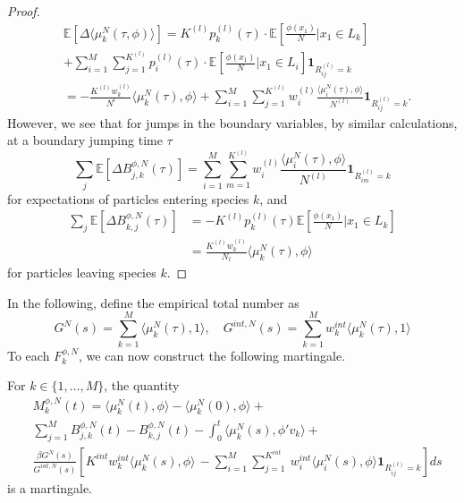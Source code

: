 \begin{proof}
\begin{align}  
&\mathbb E[\Delta \langle \mu_k^N(\tau, \phi) \rangle ] = K^{(l)}p_k^{(l)}(\tau)\cdot\mathbb{E}\left[\frac{\phi(x_1)}{N}|x_1 \in L_k \right]\\&+\sum_{i= 1}^{M}\sum_{ j = 1}^{K^{(l)}}p_i^{(l)}(\tau) \cdot\mathbb{E}\left[\frac{\phi(x_1)}{N}|x_1 \in L_i \right]\mathbf{1}_{R^{(l)}_{ij} = k}\nonumber\\
&=  - \frac{K^{(l)}w^{(l)}_k}{N^{l}} \langle \mu_k^N(\tau), \phi \rangle +\sum_{i= 1}^{M}\sum_{ j = 1}^{K^{(l)}} w^{(l)}_i\frac{\langle \mu_i^N(\tau), \phi \rangle}{N^{(l)}}\mathbf{1}_{R^{(l)}_{ij} = k}. \nonumber 
\end{align}
However, we see that for jumps in the boundary variables,
by similar calculations, at a boundary jumping time $\tau$ 
\begin{equation}
\sum_j\mathbb E\left[\Delta B_{j,k}^{\phi,N}(\tau)\right] = \sum_{i = 1}^{M} \sum_{m= 1}^{K^{(l)}} w^{(l)}_i\frac{\langle \mu_i^N(\tau), \phi \rangle}{N^{(l)}}\mathbf{1}_{R^{(l)}_{im} = k}
\end{equation}
for expectations of particles entering species $k$, and   
\begin{align}
\sum_j\mathbb E\left[\Delta B_{k,j}^{\phi,N}(\tau)\right]  &=  -K^{(l)}p_k^{(l)}(\tau)\mathbb{E}\left[\frac{\phi(x_1)}{N}|x_1 \in L_k\right] \\ 
&= \frac{K^{(l)}w^{(l)}_k}{N_{l}} \langle \mu_k^N(\tau), \phi \rangle \nonumber  \end{align}
for particles leaving species $k$.
\end{proof}
  In the following, define the empirical total number as
  \begin{equation}
  G^N(s)=\sum_{k = 1}^M \langle \mu_k^N(\tau), 1 \rangle, \quad G^{int,N}(s)=\sum_{k = 1}^M w_k^{int}\langle \mu_k^N(\tau), 1 \rangle 
  \end{equation}
  To each $F_k^{\phi,N}$, we can now construct the following martingale.  

\begin{theorem} For $k \in \{1, \dots, M\}$, the quantity 
\begin{align}\label{mgaleeqn}
&M_k^{\phi,N}(t) = \langle \mu_k^N(t), \phi\rangle- \langle \mu_k^N(0), \phi\rangle+\\
&\sum_{j= 1}^M B_{j,k}^{\phi,N}(t)-B_{k,j}^{\phi,N}(t) -\int_0^t \langle \mu_k^N(s), \phi' v_k \rangle +\nonumber \\
&\frac{\beta G^N(s)}{G^{int,N}(s)} \left[K^{int}w^{int}_k \langle \mu_k^N(s),\phi\rangle\frac{}{}-\sum_{i = 1}^{M}\sum_{j = 1}^{K^{int}}\  w^{int}_i \langle \mu_i^N(s),\phi\rangle\mathbf{1}_{R^{(l)}_{ij} = k}\right]ds \nonumber  
\end{align}
is a martingale.
\end{theorem}

